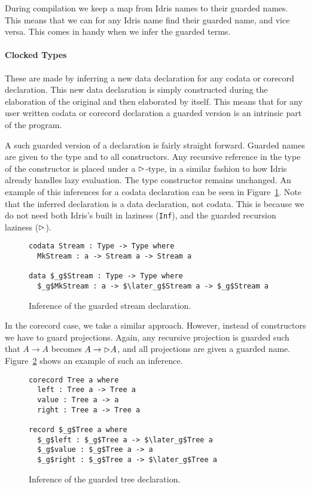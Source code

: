 During compilation we keep a map from Idris names to their guarded names. This
means that we can for any Idris name find their guarded name, and vice
versa. This comes in handy when we infer the guarded terms.

\paragraph{Clocked Types}
These are made by inferring a new data declaration for any codata or corecord
declaration. This new data declaration is simply constructed during the
elaboration of the original and then elaborated by itself. This means that for
any user written codata or corecord declaration a guarded version is an
intrinsic part of the program. 

A such guarded version of a declaration is fairly straight forward. Guarded
names are given to the type and to all constructors. Any recursive reference in
the type of the constructor is placed under a $\rhd$-type, in a similar
fashion to how Idris already handles lazy evaluation. The type constructor
remains unchanged. An example of this inferences for a codata declaration can be
seen in Figure~\ref{fig:guarded_stream_inf}. Note that the inferred declaration
is a data declaration, not codata. This is because we do not need both Idris's
built in laziness (\texttt{Inf}), and the guarded recursion laziness ($\rhd$).

\begin{figure}[h]
\begin{lstlisting}[mathescape]
codata Stream : Type -> Type where
  MkStream : a -> Stream a -> Stream a

data $_g$Stream : Type -> Type where
  $_g$MkStream : a -> $\later_g$Stream a -> $_g$Stream a
\end{lstlisting}
  \caption{Inference of the guarded stream declaration.}
  \label{fig:guarded_stream_inf}
\end{figure}

In the corecord case, we take a similar approach. However, instead of
constructors we have to guard projections. Again, any recursive projection is
guarded such that $A \rightarrow A$ becomes $A \rightarrow \rhd A$, and all
projections are given a guarded name. Figure~\ref{fig:guarded_tree_inf} shows an
example of such an inference.

\begin{figure}[h]
\begin{lstlisting}[mathescape]
corecord Tree a where
  left : Tree a -> Tree a
  value : Tree a -> a
  right : Tree a -> Tree a

record $_g$Tree a where
  $_g$left : $_g$Tree a -> $\later_g$Tree a
  $_g$value : $_g$Tree a -> a
  $_g$right : $_g$Tree a -> $\later_g$Tree a
\end{lstlisting}
  \caption{Inference of the guarded tree declaration.}
  \label{fig:guarded_tree_inf}
\end{figure}

